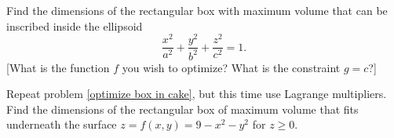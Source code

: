 \begin{problem}
 Find the dimensions of the rectangular box with maximum volume that can be inscribed inside the ellipsoid $$\frac{x^2}{a^2}+\frac{y^2}{b^2}+\frac{z^2}{c^2}=1.$$
[What is the function $f$ you wish to optimize? What is the constraint $g=c$?]
\end{problem}

\begin{problem}
Repeat problem \ref{optimize box in cake}, but this time use Lagrange multipliers.
Find the dimensions of the rectangular box of maximum volume that fits underneath the surface $z=f(x,y)=9-x^2-y^2$ for $z\geq 0$.
\end{problem}



